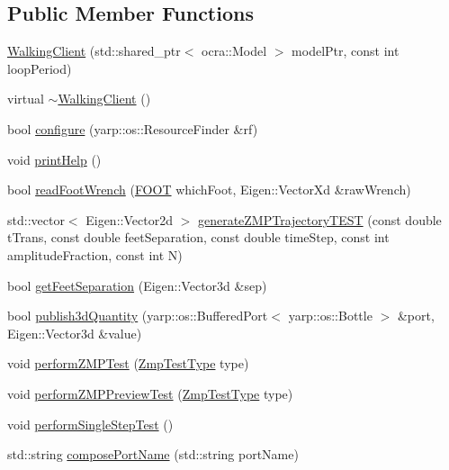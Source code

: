 \subsection*{\-Public \-Member \-Functions}
\begin{DoxyCompactItemize}
\item 
\hyperlink{classWalkingClient_a6c9002a44a54814c4b482739824e39aa}{\-Walking\-Client} (std\-::shared\-\_\-ptr$<$ ocra\-::\-Model $>$ model\-Ptr, const int loop\-Period)
\item 
virtual \hyperlink{classWalkingClient_a1dbc0308f844aea6542750104fddf8e2}{$\sim$\-Walking\-Client} ()
\item 
bool \hyperlink{classWalkingClient_adb8f972f34cb39c69c02a7c3cb493b81}{configure} (yarp\-::os\-::\-Resource\-Finder \&rf)
\item 
void \hyperlink{classWalkingClient_aff3fabef11d9c8b747a422f879c26067}{print\-Help} ()
\item 
bool \hyperlink{classWalkingClient_a03ea2313c954a97aeb4d5b614f3e6caa}{read\-Foot\-Wrench} (\hyperlink{utils_8h_a4b6a8e135f90bd56e5a57a60efb42529}{\-F\-O\-O\-T} which\-Foot, \-Eigen\-::\-Vector\-Xd \&raw\-Wrench)
\item 
std\-::vector$<$ \-Eigen\-::\-Vector2d $>$ \hyperlink{classWalkingClient_a3185a8ede8bf8b1227f7dd540ba87e3c}{generate\-Z\-M\-P\-Trajectory\-T\-E\-S\-T} (const double t\-Trans, const double feet\-Separation, const double time\-Step, const int amplitude\-Fraction, const int \-N)
\item 
bool \hyperlink{classWalkingClient_a87e70046251149b4b7aff1dc57b3dcc4}{get\-Feet\-Separation} (\-Eigen\-::\-Vector3d \&sep)
\item 
bool \hyperlink{classWalkingClient_ae6d6c046a9a3e51771afe8b4c105b412}{publish3d\-Quantity} (yarp\-::os\-::\-Buffered\-Port$<$ yarp\-::os\-::\-Bottle $>$ \&port, \-Eigen\-::\-Vector3d \&value)
\item 
void \hyperlink{classWalkingClient_ae3c259f7615c85ce53a413f6e7ab4b76}{perform\-Z\-M\-P\-Test} (\hyperlink{utils_8h_afc01479a47f5a87462a54b6a9e11fffa}{\-Zmp\-Test\-Type} type)
\item 
void \hyperlink{classWalkingClient_a3b1217b7fa17f76f162be0e12e419d96}{perform\-Z\-M\-P\-Preview\-Test} (\hyperlink{utils_8h_afc01479a47f5a87462a54b6a9e11fffa}{\-Zmp\-Test\-Type} type)
\item 
void \hyperlink{classWalkingClient_a49fb64ddafa81f0a5f29a8c0fc5188bd}{perform\-Single\-Step\-Test} ()
\item 
std\-::string \hyperlink{classWalkingClient_ae8f7dc629313df7d362e3edd6f45ae10}{compose\-Port\-Name} (std\-::string port\-Name)

\end{DoxyCompactItemize}
